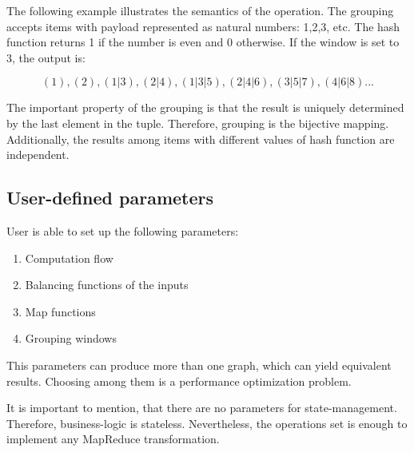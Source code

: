 The following example illustrates the semantics of the operation. The grouping accepts items with payload represented as natural numbers: 1,2,3, etc. The hash function returns 1 if the number is even and 0 otherwise. If the window is set to 3, the output is:

\[(1), (2), (1|3), (2|4), (1|3|5), (2|4|6), (3|5|7), (4|6|8)...\]

The important property of the grouping is that the result is uniquely determined by the last element in the tuple. Therefore, grouping is the bijective mapping. Additionally, the results among items with different values of hash function are independent.

\subsection{User-defined parameters}

User is able to set up the following parameters:

\begin{enumerate}
  \item{Computation flow}
  \item{Balancing functions of the inputs}
  \item{Map functions}
  \item{Grouping windows}
\end{enumerate}

This parameters can produce more than one graph, which can yield equivalent results. Choosing among them is a performance optimization problem.    

It is important to mention, that there are no parameters for state-management. Therefore, business-logic is stateless. Nevertheless, the operations set is enough to implement any MapReduce transformation.
